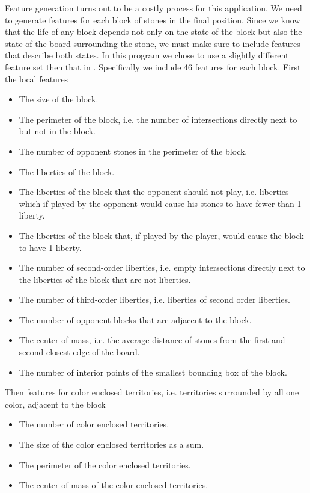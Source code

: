 \documentclass[11pt,letterpaper]{article}
\begin{document}
Feature generation turns out to be a costly process for this application. We need to generate features for each block
of stones in the final position. Since we know that the life of any block depends not only on the state of the block but
also the state of the board surrounding the stone, we must make sure to include features that describe both states.
In this program we chose to use a slightly different feature set then that in \cite{WHU:04}. Specifically we include 46
features for each block. First the local features
\begin{itemize}
  \item The size of the block.
  \item The perimeter of the block, i.e. the number of intersections directly next to but not in the block.
  \item The number of opponent stones in the perimeter of the block.
  \item The liberties of the block.
  \item The liberties of the block that the opponent should not play, i.e. liberties which if played by the opponent would
    cause his stones to have fewer than 1 liberty.
  \item The liberties of the block that, if played by the player, would cause the block to have 1 liberty.
  \item The number of second-order liberties, i.e. empty intersections directly next to the liberties of the block that
    are not liberties.
  \item The number of third-order liberties, i.e. liberties of second order liberties.
  \item The number of opponent blocks that are adjacent to the block.
  \item The center of mass, i.e. the average distance of stones from the first and second closest edge of the board.
  \item The number of interior points of the smallest bounding box of the block.
\end{itemize}
Then features for color enclosed territories, i.e. territories surrounded by all one color, adjacent to the block
\begin{itemize}
  \item The number of color enclosed territories.
  \item The size of the color enclosed territories as a sum.
  \item The perimeter of the color enclosed territories.
  \item The center of mass of the color enclosed territories.
\end{itemize}
\end{document}
